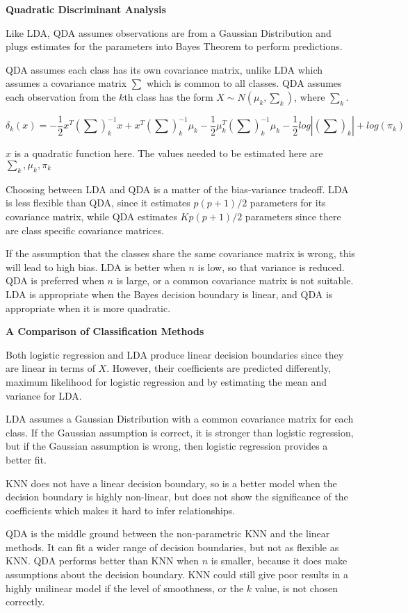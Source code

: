 \documentclass[
]{article}
\begin{document}
\textbf{Quadratic Discriminant Analysis}

Like LDA, QDA assumes observations are from a Gaussian Distribution and
plugs estimates for the parameters into Bayes Theorem to perform
predictions.

QDA assumes each class has its own covariance matrix, unlike LDA which
assumes a covariance matrix \(\sum\) which is common to all classes. QDA
assumes each observation from the \(k\)th class has the form
\(X \sim N(\mu_k, \sum_k)\), where \(\sum_k\).

\[\delta_k(x) = -\frac{1}{2}x^T (\sum)^{-1}_kx+x^T(\sum)^{-1}_k\mu_k - \frac{1}{2}\mu^T_k (\sum)_k^{-1}\mu_k - \frac{1}{2}log|(\sum)_k| + log(\pi_k)\]

\(x\) is a quadratic function here. The values needed to be estimated
here are \({\sum}_k, \mu_k, \pi_k\)

Choosing between LDA and QDA is a matter of the bias-variance tradeoff.
LDA is less flexible than QDA, since it estimates \(p(p+1)/2\)
parameters for its covariance matrix, while QDA estimates \(Kp(p+1)/2\)
parameters since there are class specific covariance matrices.

If the assumption that the classes share the same covariance matrix is
wrong, this will lead to high bias. LDA is better when \(n\) is low, so
that variance is reduced. QDA is preferred when \(n\) is large, or a
common covariance matrix is not suitable. LDA is appropriate when the
Bayes decision boundary is linear, and QDA is appropriate when it is
more quadratic.

\textbf{A Comparison of Classification Methods}

Both logistic regression and LDA produce linear decision boundaries
since they are linear in terms of \(X\). However, their coefficients are
predicted differently, maximum likelihood for logistic regression and by
estimating the mean and variance for LDA.

LDA assumes a Gaussian Distribution with a common covariance matrix for
each class. If the Gaussian assumption is correct, it is stronger than
logistic regression, but if the Gaussian assumption is wrong, then
logistic regression provides a better fit.

KNN does not have a linear decision boundary, so is a better model when
the decision boundary is highly non-linear, but does not show the
significance of the coefficients which makes it hard to infer
relationships.

QDA is the middle ground between the non-parametric KNN and the linear
methods. It can fit a wider range of decision boundaries, but not as
flexible as KNN. QDA performs better than KNN when \(n\) is smaller,
because it does make assumptions about the decision boundary. KNN could
still give poor results in a highly unilinear model if the level of
smoothness, or the \(k\) value, is not chosen correctly.
\end{document}
